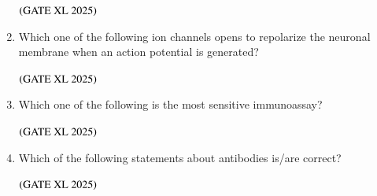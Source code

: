 \documentclass[journal]{IEEEtran}
\begin{document}
\begin{enumerate}
    \hfill $\left(\text{GATE XL 2025}\right)$

    \begin{enumerate}
    \end{enumerate}

    \item Which one of the following ion channels opens to repolarize the neuronal membrane when an action potential is generated?

    \hfill $\left(\text{GATE XL 2025}\right)$

    \begin{enumerate}
    \end{enumerate}

    \item Which one of the following is the most sensitive immunoassay?

    \hfill $\left(\text{GATE XL 2025}\right)$

    \begin{enumerate}
    \end{enumerate}

    \item Which of the following statements about antibodies is/are correct?

    \hfill $\left(\text{GATE XL 2025}\right)$


\end{enumerate}
\end{document}
